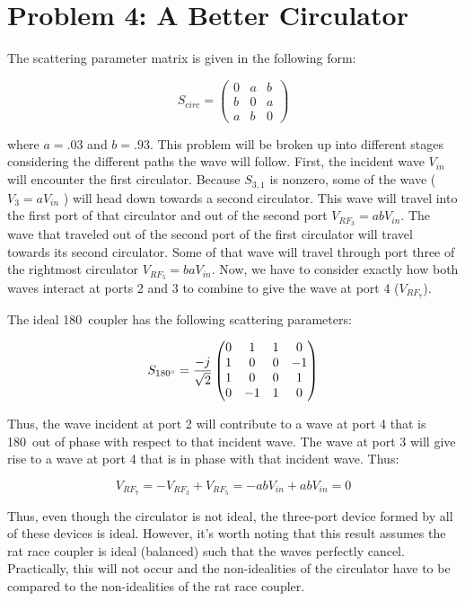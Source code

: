 \section*{Problem 4: A Better Circulator}

The scattering parameter matrix is given in the following form:

\[ 
    S_{circ} = \begin{pmatrix}
        0 & a & b \\ b & 0 & a \\ a & b & 0
    \end{pmatrix} 
\]

where $ a = .03$ and $b = .93$. This problem will be broken up into different
stages considering the different paths the wave will follow. First, the
incident wave $V_{in}$ will encounter the first circulator. Because $S_{3,1}$ is
nonzero, some of the wave ( $V_3 = a V_{in}$ ) will head down towards a second
circulator. This wave will travel into the first port of that circulator and out
of the second port $V_{RF_3} = a b V_{in}$. The wave that traveled out of the
second port of the first circulator will travel towards its second circulator.
Some of that wave will travel through port three of the rightmost circulator
$V_{RF_5} = b a V_{in}$. Now, we have to consider exactly how both waves
interact at ports 2 and 3 to combine to give the wave at port 4 ($V_{RF_7}$).

The ideal 180\degree~coupler has the following scattering parameters:

\[
    S_{180 \degree} = \frac{-j}{\sqrt{2}} \begin{pmatrix}
        0 & 1 & 1 & 0 \\ 1 & 0 & 0 & -1 \\ 1 & 0 & 0 & 1 \\ 0 & -1 & 1 & 0
    \end{pmatrix}
\]

Thus, the wave incident at port 2 will contribute to a wave at port 4 that is
180\degree~out of phase with respect to that incident wave. The wave at port 3
will give rise to a wave at port 4 that is in phase with that incident wave.
Thus:

\[ 
    V_{RF_7} = -V_{RF_3} + V_{RF_5} = -a b V_{in} + a b V_{in} = 0
\]

Thus, even though the circulator is not ideal, the three-port device formed by all of
these devices is ideal. However, it's worth noting that this result assumes the
rat race coupler is ideal (balanced) such that the waves perfectly cancel.
Practically, this will not occur and the non-idealities of the circulator have
to be compared to the non-idealities of the rat race coupler.

